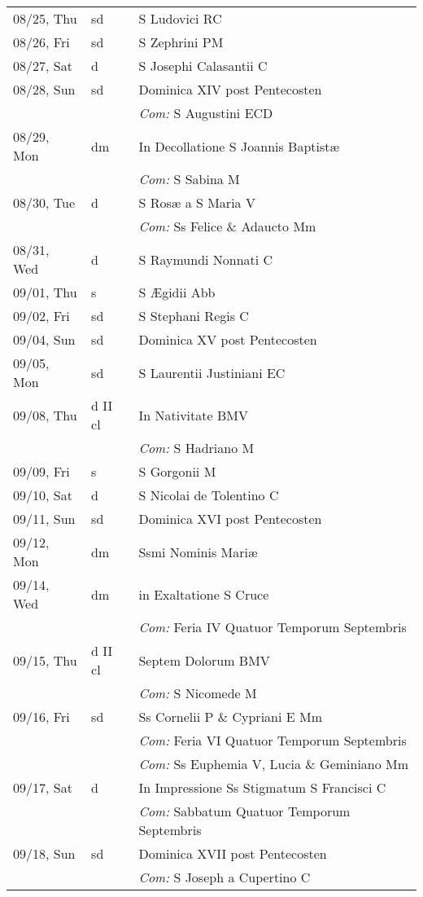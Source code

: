 \documentclass[10pt]{article}
\begin{document}
\begin{longtable}{ l l l }
08/25, Thu & sd & S Ludovici RC\\
08/26, Fri & sd & S Zephrini PM\\
08/27, Sat & d & S Josephi Calasantii C\\
08/28, Sun & sd & Dominica XIV post Pentecosten\\
 & & \textit{Com:} S Augustini ECD\\
08/29, Mon & dm & In Decollatione S Joannis Baptistæ\\
 & & \textit{Com:} S Sabina M\\
08/30, Tue & d & S Rosæ a S Maria V\\
 & & \textit{Com:} Ss Felice \& Adaucto Mm\\
08/31, Wed & d & S Raymundi Nonnati C\\
09/01, Thu & s & S Ægidii Abb\\
09/02, Fri & sd & S Stephani Regis C\\
09/04, Sun & sd & Dominica XV post Pentecosten\\
09/05, Mon & sd & S Laurentii Justiniani EC\\
09/08, Thu & d II cl & In Nativitate BMV\\
 & & \textit{Com:} S Hadriano M\\
09/09, Fri & s & S Gorgonii M\\
09/10, Sat & d & S Nicolai de Tolentino C\\
09/11, Sun & sd & Dominica XVI post Pentecosten\\
09/12, Mon & dm & Ssmi Nominis Mariæ\\
09/14, Wed & dm & in Exaltatione S Cruce\\
 & & \textit{Com:} Feria IV Quatuor Temporum Septembris\\
09/15, Thu & d II cl & Septem Dolorum BMV\\
 & & \textit{Com:} S Nicomede M\\
09/16, Fri & sd & Ss Cornelii P \& Cypriani E Mm\\
 & & \textit{Com:} Feria VI Quatuor Temporum Septembris\\
 & & \textit{Com:} Ss Euphemia V, Lucia \& Geminiano Mm\\
09/17, Sat & d & In Impressione Ss Stigmatum S Francisci C\\
 & & \textit{Com:} Sabbatum Quatuor Temporum Septembris\\
09/18, Sun & sd & Dominica XVII post Pentecosten\\
 & & \textit{Com:} S Joseph a Cupertino C\\

\end{longtable}
\end{document}
